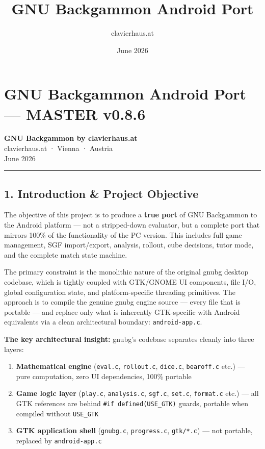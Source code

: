 \documentclass[11pt,a4paper]{article}
\title{\textbf{GNU Backgammon Android Port}}
\author{clavierhaus.at}
\date{June 2026}
\providecommand{\tightlist}{\setlength{\itemsep}{2pt}\setlength{\parskip}{0pt}}
\begin{document}
\maketitle\thispagestyle{fancy}

\tableofcontents\newpage

\section{GNU Backgammon Android Port --- MASTER v0.8.6}\label{gnu-backgammon-android-port-master-v085}

\textbf{GNU Backgammon by clavierhaus.at}\\
clavierhaus.at · Vienna · Austria\\
June 2026

\begin{center}\rule{0.5\linewidth}{0.5pt}\end{center}

\subsection{1. Introduction \& Project Objective}\label{introduction-project-objective}

The objective of this project is to produce a \textbf{true port} of GNU
Backgammon to the Android platform --- not a stripped-down evaluator,
but a complete port that mirrors 100\% of the functionality of the PC
version. This includes full game management, SGF import/export,
analysis, rollout, cube decisions, tutor mode, and the complete match
state machine.

The primary constraint is the monolithic nature of the original gnubg
desktop codebase, which is tightly coupled with GTK/GNOME UI components,
file I/O, global configuration state, and platform-specific threading
primitives. The approach is to compile the genuine gnubg engine source
--- every file that is portable --- and replace only what is inherently
GTK-specific with Android equivalents via a clean architectural
boundary: \texttt{android-app.c}.

\textbf{The key architectural insight:} gnubg's codebase separates
cleanly into three layers:

\begin{enumerate}
\def\labelenumi{\arabic{enumi}.}
\tightlist
\item
  \textbf{Mathematical engine} (\texttt{eval.c}, \texttt{rollout.c},
  \texttt{dice.c}, \texttt{bearoff.c} etc.) --- pure computation, zero
  UI dependencies, 100\% portable
\item
  \textbf{Game logic layer} (\texttt{play.c}, \texttt{analysis.c},
  \texttt{sgf.c}, \texttt{set.c}, \texttt{format.c} etc.) --- all GTK
  references are behind \texttt{\#if\ defined(USE\_GTK)} guards,
  portable when compiled without \texttt{USE\_GTK}
\item
  \textbf{GTK application shell} (\texttt{gnubg.c}, \texttt{progress.c},
  \texttt{gtk/*.c}) --- not portable, replaced by \texttt{android-app.c}
\end{enumerate}
\end{document}
